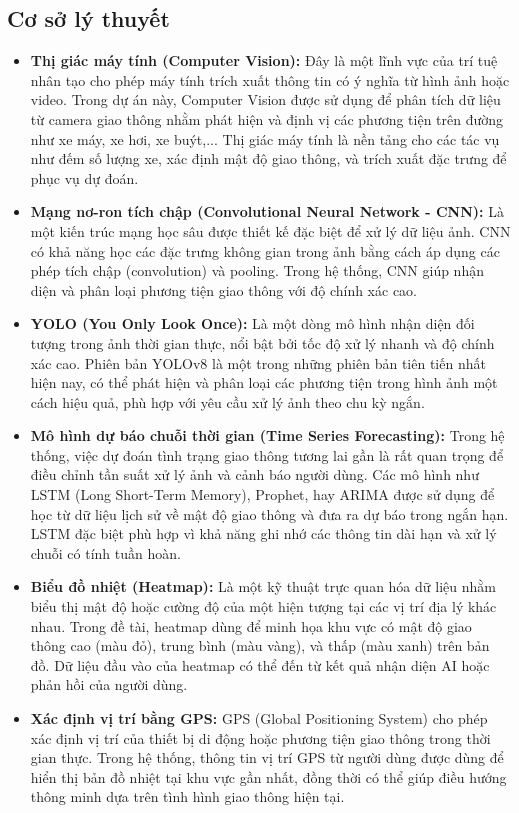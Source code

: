 \subsection{Cơ sở lý thuyết}
\begin{itemize}
  \item \textbf{Thị giác máy tính (Computer Vision):} Đây là một lĩnh vực của trí tuệ nhân tạo cho phép máy tính trích xuất thông tin có ý nghĩa từ hình ảnh hoặc video. Trong dự án này, Computer Vision được sử dụng để phân tích dữ liệu từ camera giao thông nhằm phát hiện và định vị các phương tiện trên đường như xe máy, xe hơi, xe buýt,... Thị giác máy tính là nền tảng cho các tác vụ như đếm số lượng xe, xác định mật độ giao thông, và trích xuất đặc trưng để phục vụ dự đoán.

  \item \textbf{Mạng nơ-ron tích chập (Convolutional Neural Network - CNN):} Là một kiến trúc mạng học sâu được thiết kế đặc biệt để xử lý dữ liệu ảnh. CNN có khả năng học các đặc trưng không gian trong ảnh bằng cách áp dụng các phép tích chập (convolution) và pooling. Trong hệ thống, CNN giúp nhận diện và phân loại phương tiện giao thông với độ chính xác cao.

  \item \textbf{YOLO (You Only Look Once):} Là một dòng mô hình nhận diện đối tượng trong ảnh thời gian thực, nổi bật bởi tốc độ xử lý nhanh và độ chính xác cao. Phiên bản YOLOv8 là một trong những phiên bản tiên tiến nhất hiện nay, có thể phát hiện và phân loại các phương tiện trong hình ảnh một cách hiệu quả, phù hợp với yêu cầu xử lý ảnh theo chu kỳ ngắn.

  \item \textbf{Mô hình dự báo chuỗi thời gian (Time Series Forecasting):} Trong hệ thống, việc dự đoán tình trạng giao thông tương lai gần là rất quan trọng để điều chỉnh tần suất xử lý ảnh và cảnh báo người dùng. Các mô hình như LSTM (Long Short-Term Memory), Prophet, hay ARIMA được sử dụng để học từ dữ liệu lịch sử về mật độ giao thông và đưa ra dự báo trong ngắn hạn. LSTM đặc biệt phù hợp vì khả năng ghi nhớ các thông tin dài hạn và xử lý chuỗi có tính tuần hoàn.

  \item \textbf{Biểu đồ nhiệt (Heatmap):} Là một kỹ thuật trực quan hóa dữ liệu nhằm biểu thị mật độ hoặc cường độ của một hiện tượng tại các vị trí địa lý khác nhau. Trong đề tài, heatmap dùng để minh họa khu vực có mật độ giao thông cao (màu đỏ), trung bình (màu vàng), và thấp (màu xanh) trên bản đồ. Dữ liệu đầu vào của heatmap có thể đến từ kết quả nhận diện AI hoặc phản hồi của người dùng.

  \item \textbf{Xác định vị trí bằng GPS:} GPS (Global Positioning System) cho phép xác định vị trí của thiết bị di động hoặc phương tiện giao thông trong thời gian thực. Trong hệ thống, thông tin vị trí GPS từ người dùng được dùng để hiển thị bản đồ nhiệt tại khu vực gần nhất, đồng thời có thể giúp điều hướng thông minh dựa trên tình hình giao thông hiện tại.
\end{itemize}

